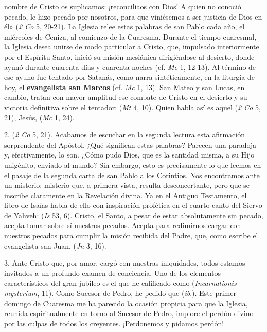 \begin{body}
 nombre de Cristo os suplicamos: ¡reconciliaos con Dios! A quien no conoció pecado, le hizo pecado por nosotros, para que viniésemos a ser justicia de Dios en él» (\textit{2 Co} 5, 20-21). La Iglesia relee estas palabras de san Pablo cada año, el miércoles de Ceniza, al comienzo de la Cuaresma. Durante el tiempo cuaresmal, la Iglesia desea unirse de modo particular a Cristo, que, impulsado interiormente por el Espíritu Santo, inició su misión mesiánica dirigiéndose al desierto, donde ayunó durante cuarenta días y cuarenta noches (cf. \textit{Mc} 1, 12-13). Al término de ese ayuno fue tentado por Satanás, como narra sintéticamente, en la liturgia de hoy, el \textbf{evangelista san Marcos} (cf. \textit{Mc} 1, 13). San Mateo y san Lucas, en cambio, tratan con mayor amplitud ese combate de Cristo en el desierto y su victoria definitiva sobre el tentador:  (\textit{Mt} 4, 10). Quien habla así es aquel  (\textit{2 Co} 5, 21), Jesús,  (\textit{Mc} 1, 24).

2.  (\textit{2 Co} 5, 21). Acabamos de escuchar en la segunda lectura esta afirmación sorprendente del Apóstol. ¿Qué significan estas palabras? Parecen una paradoja y, efectivamente, lo son. ¿Cómo pudo Dios, que es la santidad misma,  a su Hijo unigénito, enviado al mundo? Sin embargo, esto es precisamente lo que leemos en el pasaje de la segunda carta de san Pablo a los Corintios. Nos encontramos ante un misterio: misterio que, a primera vista, resulta desconcertante, pero que se inscribe claramente en la Revelación divina. Ya en el Antiguo Testamento, el libro de Isaías habla de ello con inspiración profética en el cuarto canto del Siervo de Yahveh:  (\textit{Is} 53, 6). Cristo, el Santo, a pesar de estar absolutamente sin pecado, acepta tomar sobre sí nuestros pecados. Acepta para redimirnos cargar con nuestros pecados para cumplir la misión recibida del Padre, que, como escribe el evangelista san Juan,  (\textit{Jn} 3, 16).

3. Ante Cristo que, por amor, cargó con nuestras iniquidades, todos estamos invitados a un profundo examen de conciencia. Uno de los elementos característicos del gran jubileo es el que he calificado como  (\textit{Incarnationis mysterium}, 11). Como Sucesor de Pedro, he pedido que  (\textit{ib}.). Este primer domingo de Cuaresma me ha parecido la ocasión propicia para que la Iglesia, reunida espiritualmente en torno al Sucesor de Pedro, implore el perdón divino por las culpas de todos los creyentes. ¡Perdonemos y pidamos perdón!


\end{body}
